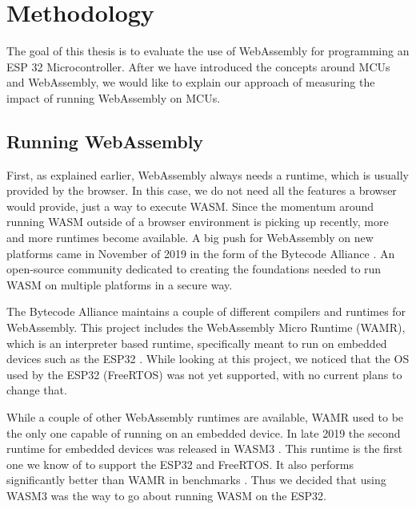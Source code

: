 
\chapter{Methodology}\label{chapter:methodology}

The goal of this thesis is to evaluate the use of WebAssembly for programming an ESP 32 Microcontroller. After we have introduced the concepts around MCUs and WebAssembly, we would like to explain our approach of measuring the impact of running WebAssembly on MCUs.

\section{Running WebAssembly}

First, as explained earlier, WebAssembly always needs a runtime, which is usually provided by the browser. In this case, we do not need all the features a browser would provide, just a way to execute WASM. Since the momentum around running WASM outside of a browser environment is picking up recently, more and more runtimes become available. A big push for WebAssembly on new platforms came in November of 2019 in the form of the Bytecode Alliance \autocite{noauthor_bytecode_nodate}. An open-source community dedicated to creating the foundations needed to run WASM on multiple platforms in a secure way.

The Bytecode Alliance maintains a couple of different compilers and runtimes for WebAssembly. This project includes the WebAssembly Micro Runtime (WAMR), which is an interpreter based runtime, specifically meant to run on embedded devices such as the ESP32 \autocite{noauthor_bytecodealliancewasm-micro-runtime_2020}. While looking at this project, we noticed that the OS used by the ESP32 (FreeRTOS) was not yet supported, with no current plans to change that.

While a couple of other WebAssembly runtimes are available, \autocite{akinyemi_appcypherawesome-wasm-runtimes_2020} WAMR used to be the only one capable of running on an embedded device. In late 2019 the second runtime for embedded devices was released in WASM3 \autocite{noauthor_wasm3wasm3_2020}. This runtime is the first one we know of to support the ESP32 and FreeRTOS. It also performs significantly better than WAMR in benchmarks \autocite{shymanskyy_wasm3_2020}. Thus we decided that using WASM3 was the way to go about running WASM on the ESP32.

